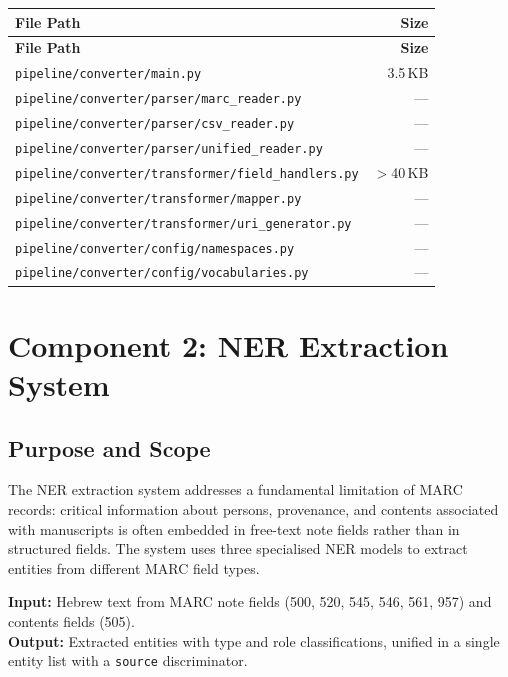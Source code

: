 \documentclass[12pt]{article}
\newcommand{\filepath}[1]{\texttt{\small #1}}
\newcommand{\code}[1]{\texttt{#1}}
\begin{document}
\begin{longtable}{|p{11cm}|r|}
\hline
\textbf{File Path} & \textbf{Size} \\
\hline
\endfirsthead
\hline
\textbf{File Path} & \textbf{Size} \\
\hline
\endhead
\hline
\endfoot
\filepath{pipeline/converter/main.py} & 3.5\,KB \\
\hline
\filepath{pipeline/converter/parser/marc\_reader.py} & --- \\
\hline
\filepath{pipeline/converter/parser/csv\_reader.py} & --- \\
\hline
\filepath{pipeline/converter/parser/unified\_reader.py} & --- \\
\hline
\filepath{pipeline/converter/transformer/field\_handlers.py} & $>$40\,KB \\
\hline
\filepath{pipeline/converter/transformer/mapper.py} & --- \\
\hline
\filepath{pipeline/converter/transformer/uri\_generator.py} & --- \\
\hline
\filepath{pipeline/converter/config/namespaces.py} & --- \\
\hline
\filepath{pipeline/converter/config/vocabularies.py} & --- \\
\hline
\end{longtable}


\section{Component 2: NER Extraction System}
\label{sec:ner}

\subsection{Purpose and Scope}

The NER extraction system addresses a fundamental limitation of MARC records: critical information about persons, provenance, and contents associated with manuscripts is often embedded in free-text note fields rather than in structured fields. The system uses three specialised NER models to extract entities from different MARC field types.

\textbf{Input:} Hebrew text from MARC note fields (500, 520, 545, 546, 561, 957) and contents fields (505).\\
\textbf{Output:} Extracted entities with type and role classifications, unified in a single entity list with a \code{source} discriminator.
\end{document}
